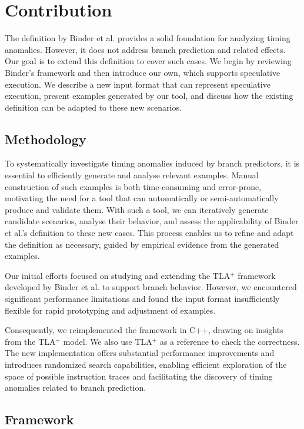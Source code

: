 \chapter{Contribution}
The definition by Binder et al. \cite{binder_definitions_2022} provides a solid foundation for analyzing timing anomalies. However, it does not address branch prediction and related effects. Our goal is to extend this definition to cover such cases. We begin by reviewing Binder's framework and then introduce our own, which supports speculative execution. We describe a new input format that can represent speculative execution, present examples generated by our tool, and discuss how the existing definition can be adapted to these new scenarios.

\section{Methodology}
To systematically investigate timing anomalies induced by branch predictors, it is essential to efficiently generate and analyse relevant examples. Manual construction of such examples is both time-consuming and error-prone, motivating the need for a tool that can automatically or semi-automatically produce and validate them. With such a tool, we can iteratively generate candidate scenarios, analyse their behavior, and assess the applicability of Binder et al.'s definition to these new cases. This process enables us to refine and adapt the definition as necessary, guided by empirical evidence from the generated examples.

Our initial efforts focused on studying and extending the TLA$^+$ \cite{lamport_specifying_2003} framework developed by Binder et al.  to support branch behavior. However, we encountered significant performance limitations and found the input format insufficiently flexible for rapid prototyping and adjustment of examples.

Consequently, we reimplemented the framework in C++, drawing on insights from the TLA$^+$ model. We also use TLA$^+$ as a reference to check the correctness. The new implementation offers substantial performance improvements and introduces randomized search capabilities, enabling efficient exploration of the space of possible instruction traces and facilitating the discovery of timing anomalies related to branch prediction.

\section{Framework}

